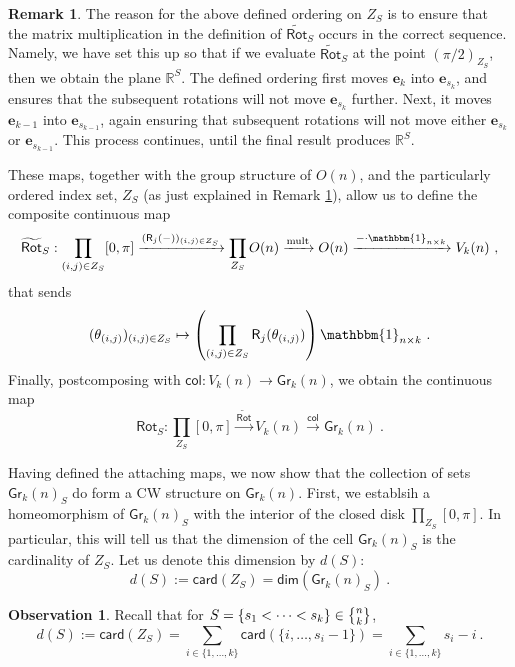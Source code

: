 \documentclass{article}
\newcommand{\bb}[1]{\mathbb{#1}}
\newcommand{\msf}[1]{\mathsf{#1}}
\newcommand{\mbf}[1]{\mathbf{#1}}
\newcommand{\gr}{\msf{Gr}}
\newcommand{\nchoosek}{\textstyle\genfrac{\lbrace}{\rbrace}{0pt}{}}
\newcommand{\rot}{\msf{Rot}}
\newcommand{\trot}{\widetilde{\msf{Rot}}}
\newcommand{\R}{\msf{R}}
\newcommand{\uno}{\mathbbm{1}}
\newcommand{\card}{\msf{card}}
\renewcommand{\dim}{\msf{dim}}
\newcommand{\col}{\msf{col}}
\newcommand{\e}{\mbf{e}}
\theoremstyle{definition}
\newtheorem{remark}[theorem]{Remark}
\newtheorem{observation}[theorem]{Observation}
\begin{document}
\begin{remark}\label{indexSet}
    The reason for the above defined ordering on $Z_S$ is to ensure that the matrix multiplication in the 
    definition of $\trot_S$
    occurs in the correct sequence. Namely, we have set this up so that if we evaluate $\trot_S$ at the point
    $(\pi/2)_{Z_S}$, then we obtain the plane $\bb{R}^S$. The defined ordering first moves $\e_k$ into $\e_{s_k}$,
    and ensures that the subsequent rotations will not move 
    $\e_{s_k}$ further. Next, it moves $\e_{k-1}$ into $\e_{s_{k-1}}$, again ensuring that subsequent rotations will
    not move either $\e_{s_k}$ or $\e_{s_{k-1}}$. This process continues, until the final result produces $\bb{R}^S$. 
\end{remark}

These maps, together with the group structure of $O(n)$, and the particularly ordered index set, $Z_S$
(as just explained in Remark \ref{indexSet}), 
allow us to define the composite continuous map
$$\trot_S: \prod_{(i,j) \in Z_S}[0,\pi] \xrightarrow{(\R_j(-))_{(i,j) \in Z_S}} \prod_{Z_S} O(n) \xrightarrow{\text{mult}}
        O(n) \xrightarrow{- \cdot \uno_{n \times k}} V_k(n)~,$$
that sends 
$$(\theta_{(i,j)})_{(i,j) \in Z_S} \mapsto
        \left(\prod_{(i,j) \in Z_S} \R_j(\theta_{(i,j)})\right) \uno_{n\times k}~.$$
Finally, postcomposing with $\col:V_k(n) \to \gr_k(n)$, we obtain the continuous map
$$\rot_S: \prod_{Z_S}[0,\pi] \xrightarrow{\trot} V_k(n) \xrightarrow{\col} \gr_k(n)~.$$


Having defined the attaching maps, we now show that the collection of sets $\gr_k(n)_S$ do form a CW structure
on $\gr_k(n)$.
First,
we establsih a homeomorphism of $\gr_k(n)_S$ with the interior of the closed disk $\prod_{Z_S} [0,\pi]$. 
In particular, this will tell us that the dimension of the cell $\gr_k(n)_S$ is the cardinality of $Z_S$. Let us
denote this dimension by $d(S)$:
$$d(S) := \card(Z_S) = \dim(\gr_k(n)_S)~.$$
\begin{observation}\label{dimension}
    Recall that for $S=\{s_1< \cdots <s_k\} \in \nchoosek{n}{k}$, 
    $$d(S) := \card(Z_S) = \sum_{i \in \{1, \dots, k\}} \card(\{i, \dots, s_i-1\}) = \sum_{i \in \{1, \dots, k\}} s_i-i~.$$
\end{observation}
\end{document}
